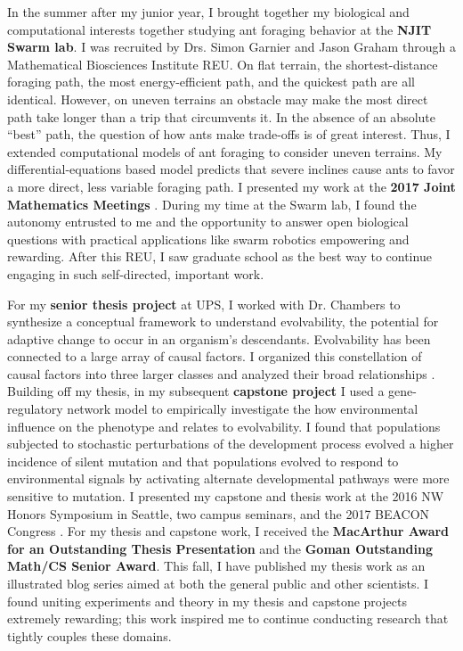 In the summer after my junior year, I brought together my biological and computational interests together studying ant foraging behavior at the \textbf{NJIT Swarm lab}.
I was recruited by Drs. Simon Garnier and Jason Graham through a Mathematical Biosciences Institute REU.
On flat terrain, the shortest-distance foraging path, the most energy-efficient path, and the quickest path are all identical.
However, on uneven terrains an obstacle may make the most direct path take longer than a trip that circumvents it.
In the absence of an absolute ``best'' path, the question of how ants make trade-offs is of great interest.
Thus, I extended computational models of ant foraging to consider uneven terrains.
My differential-equations based model predicts that severe inclines cause ants to favor a more direct, less variable foraging path.
I presented my work at the \textbf{2017 Joint Mathematics Meetings} \cite{jmm}.
During my time at the Swarm lab, I found the autonomy entrusted to me and the opportunity to answer open biological questions with practical applications like swarm robotics empowering and rewarding.
After this REU, I saw graduate school as the best way to continue engaging in such self-directed, important work.

For my \textbf{senior thesis project} at UPS, I worked with Dr. Chambers to synthesize a conceptual framework to understand evolvability, the potential for adaptive change to occur in an organism's descendants.
Evolvability has been connected to a large array of causal factors.
I organized this constellation of causal factors into three larger classes and analyzed their broad relationships \cite{thesis}.
Building off my thesis, in my subsequent \textbf{capstone project} I used a gene-regulatory network model to empirically investigate the how environmental influence on the phenotype and relates to evolvability.
I found that populations subjected to stochastic perturbations of the development process evolved a higher incidence of silent mutation and that populations evolved to respond to environmental signals by activating alternate developmental pathways were more sensitive to mutation.
I presented my capstone and thesis work at the 2016 NW Honors Symposium in Seattle, two campus seminars, and the 2017 BEACON Congress \cite{beacon}.
For my thesis and capstone work, I received the \textbf{MacArthur Award for an Outstanding Thesis Presentation} and the \textbf{Goman Outstanding Math/CS Senior Award}.
This fall, I have published my thesis work as an illustrated blog series aimed at both the general public and other scientists.
I found uniting experiments and theory in my thesis and capstone projects extremely rewarding;
this work inspired me to continue conducting research that tightly couples these domains.
